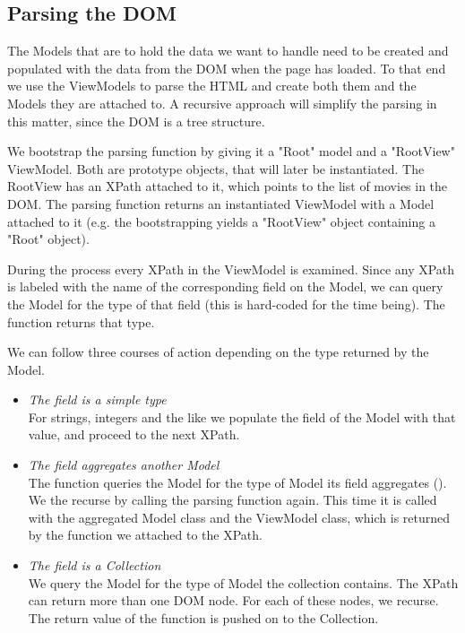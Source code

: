 \subsection{Parsing the DOM}

The Models that are to hold the data we want to handle need to be created and
populated with the data from the DOM when the page has loaded.
To that end we use the ViewModels to parse the HTML and create both them and
the Models they are attached to.
A recursive approach will simplify the parsing in this matter, since the DOM
is a tree structure.

We bootstrap the parsing function by giving it a "Root" model and a "RootView"
ViewModel. Both are prototype objects, that will later be instantiated.
The RootView has an XPath attached to it, which points to the list of movies
in the DOM. The parsing function returns an instantiated ViewModel with a Model
attached to it (e.g. the bootstrapping yields a "RootView" object containing
a "Root" object).

During the process every XPath in the ViewModel is examined.
Since any XPath is labeled with the name of the corresponding field on the
Model, we can query the Model for the type of that field
(this is hard-coded for the time being). The function 
returns that type.

We can follow three courses of action depending on the type
returned by the Model.
\begin{itemize}
	\item \emph{The field is a simple type}\\
	For strings, integers and the like we populate the field of the Model
	with that value, and proceed to the next XPath.
	\item \emph{The field aggregates another Model}\\
	The function queries the Model for the type of Model its field aggregates
	().
	We the recurse by calling the parsing function again.
	This time it is called with the aggregated Model class and
	the ViewModel class, which is returned by the  function
	we attached to the XPath.
	\item \emph{The field is a Collection}\\
	We query the Model for the type of Model the collection contains.
	The XPath can return more than one DOM node.
	For each of these nodes, we recurse.
	The return value of the function is pushed on to the Collection.
\end{itemize}

